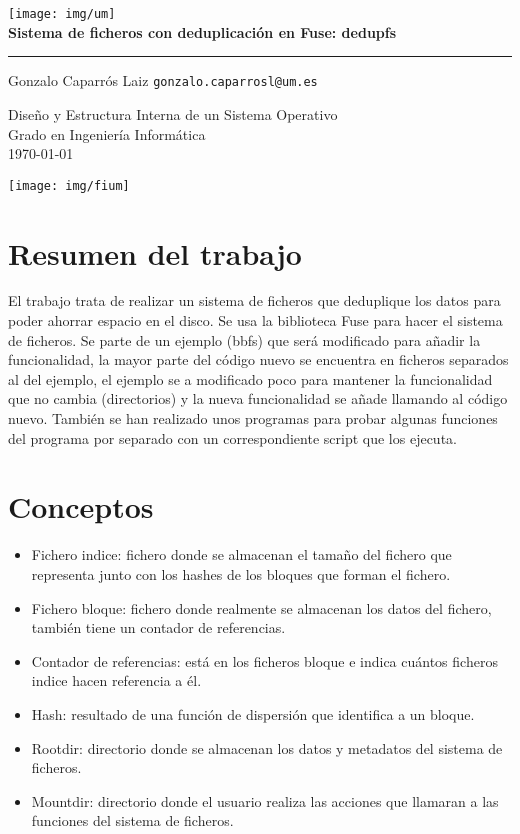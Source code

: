 \documentclass[a4paper,12pt]{article}
\begin{document}
\begin{titlepage}
\centering
\texttt{[image: img/um]}
\\
\vspace{2cm}
{\huge \textbf{Sistema de ficheros con deduplicación en Fuse: dedupfs}}
\\
\noindent\rule{10cm}{0.4pt}

Gonzalo Caparrós Laiz \texttt{gonzalo.caparrosl@um.es}

\vspace{2cm}

{\large Diseño y Estructura Interna de un Sistema Operativo}
\\
Grado en Ingeniería Informática
\vspace{1cm}
\\
\today


\vfill
\texttt{[image: img/fium]}

\end{titlepage}

\tableofcontents

\newpage
\section{Resumen del trabajo}

El trabajo trata de realizar un sistema de ficheros que deduplique los datos para poder ahorrar espacio en el disco. Se usa la biblioteca Fuse para hacer el sistema de ficheros. Se parte de un ejemplo (bbfs) que será modificado para añadir la funcionalidad, la mayor parte del código nuevo se encuentra en ficheros separados al del ejemplo, el ejemplo se a modificado poco para mantener la funcionalidad que no cambia (directorios) y la nueva funcionalidad se añade llamando al código nuevo. También se han realizado unos programas para probar algunas funciones del programa por separado con un correspondiente script que los ejecuta.

\section{Conceptos}

\begin{itemize}
\item Fichero indice: fichero donde se almacenan el tamaño del fichero que representa junto con los hashes de los bloques que forman el fichero.
\item Fichero bloque: fichero donde realmente se almacenan los datos del fichero, también tiene un contador de referencias.
\item Contador de referencias: está en los ficheros bloque e indica cuántos ficheros indice hacen referencia a él.
\item Hash: resultado de una función de dispersión que identifica a un bloque.
\item Rootdir: directorio donde se almacenan los datos y metadatos del sistema de ficheros.
\item Mountdir: directorio donde el usuario realiza las acciones que llamaran a las funciones del sistema de ficheros.
\end{itemize}
\end{document}
